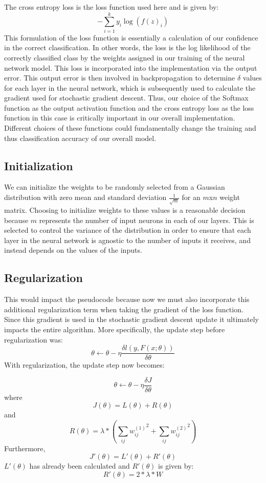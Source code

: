 \documentclass{article}
\begin{document}
The cross entropy loss is the loss function used here and is given by:
$$-\sum_{i=1}^k y_i \log(f(z)_i)$$
This formulation of the loss function is essentially a calculation of our confidence in the correct classification. In other words, the loss is the log likelihood of the correctly classified class by the weights assigned in our training of the neural network model. This loss is incorporated into the implementation via the output error. This output error is then involved in backpropagation to determine $\delta$ values for each layer in the neural network, which is subsequently used to calculate the gradient used for stochastic gradient descent. Thus, our choice of the Softmax function as the output activation function and the cross entropy loss as the loss function in this case is critically important in our overall implementation. Different choices of these functions could fundamentally change the training and thus classification accuracy of our overall model.

\subsection{Initialization}
We can initialize the weights to be randomly selected from a Gaussian distribution with zero mean and standard deviation $\frac{1}{\sqrt{m}}$ for an $m$x$n$ weight matrix. Choosing to initialize weights to these values is a reasonable decision because $m$ represents the number of input neurons in each of our layers. This is selected to control the variance of the distribution in order to ensure that each layer in the neural network is agnostic to the number of inputs it receives, and instead depends on the values of the inputs.

\subsection{Regularization}
This would impact the pseudocode because now we must also incorporate this additional regularization term when taking the gradient of the loss function. Since this gradient is used in the stochastic gradient descent update it ultimately impacts the entire algorithm. More specifically, the update step before regularization was:
$$\theta \leftarrow \theta - \eta \frac{\delta l(y,F(x;\theta))}{\delta \theta}$$
With regularization, the update step now becomes:

$$\theta \leftarrow \theta - \eta \frac{\delta J}{\delta \theta}$$
where
$$J(\theta) = L(\theta) + R(\theta)$$
and
$$R(\theta) = \lambda *(\sum_{ij} {w_{ij}^{(1)}}^2 + \sum_{ij} {w_{ij}^{(2)}}^2)$$
Furthermore,
$$J'(\theta) = L'(\theta) + R'(\theta)$$
$L'(\theta)$ has already been calculated and $R'(\theta)$ is given by:
$$R'(\theta) = 2* \lambda * W$$
\end{document}
